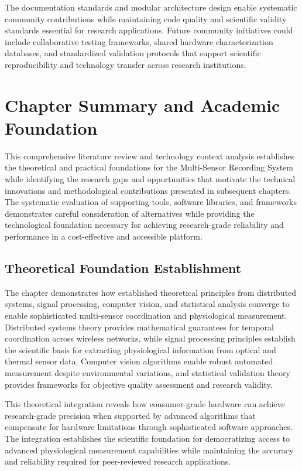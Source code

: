 \documentclass[11pt,a4paper]{report}
\begin{document}
The documentation standards and modular architecture design enable systematic community contributions while maintaining code quality and scientific validity standards essential for research applications. Future community initiatives could include collaborative testing frameworks, shared hardware characterization databases, and standardized validation protocols that support scientific reproducibility and technology transfer across research institutions.

\section{Chapter Summary and Academic Foundation}

This comprehensive literature review and technology context analysis establishes the theoretical and practical foundations for the Multi-Sensor Recording System while identifying the research gaps and opportunities that motivate the technical innovations and methodological contributions presented in subsequent chapters. The systematic evaluation of supporting tools, software libraries, and frameworks demonstrates careful consideration of alternatives while providing the technological foundation necessary for achieving research-grade reliability and performance in a cost-effective and accessible platform.

\subsection{Theoretical Foundation Establishment}

The chapter demonstrates how established theoretical principles from distributed systems, signal processing, computer vision, and statistical analysis converge to enable sophisticated multi-sensor coordination and physiological measurement. Distributed systems theory provides mathematical guarantees for temporal coordination across wireless networks, while signal processing principles establish the scientific basis for extracting physiological information from optical and thermal sensor data. Computer vision algorithms enable robust automated measurement despite environmental variations, and statistical validation theory provides frameworks for objective quality assessment and research validity.

This theoretical integration reveals how consumer-grade hardware can achieve research-grade precision when supported by advanced algorithms that compensate for hardware limitations through sophisticated software approaches. The integration establishes the scientific foundation for democratizing access to advanced physiological measurement capabilities while maintaining the accuracy and reliability required for peer-reviewed research applications.
\end{document}
